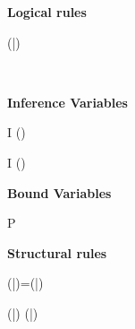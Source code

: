 \begin{figure*}[htbp]
\centering
{}
\vspace*{1em}

\begin{minipage}[t]{.4\textwidth}
\centering  
\textbf{Logical rules}
\vspace*{-1em}

\infax
  { \jexc{\Bottom}{\alpha}{\TRUE} }

\infrule
  { \jsub{\alpha}{\Bottom}{\C} }
  { \jexc{\Any}{\alpha}{\C} }

\infrule
  { \countof(\bar{\alpha})  }
  {  }

\infax
  {  }

\infrule
  { \jexc{\alpha}{\chi}{\C} \andalso 
    \\
    }
  {  }

\infrule
  { \jexc{\alpha}{\chi}{\C}  \andalso  {} }
  {  }

\vspace*{2ex}
\textbf{Inference Variables}
\vspace*{-1em}

\infrule
  { I \not\in {}(\Delta) }
  {  }
  
\infrule
  { I \not\in {}(\Delta) }
  {  }

\vspace*{2ex}
\textbf{Bound Variables}
\vspace*{-1em}

\infrule
  { \bd{\dontcare} \extends P \extends \bdb{\xi} \in \Delta \\
    \jbexc{\xi}{\alpha}{\C} }
  {  }

\vspace*{2ex}
\textbf{Structural rules}
\vspace*{-1em}

\infrule
  { \countof(\bar{\alpha})=\countof(\bar{\eta})  \andalso {} }
  { \jexc{(\bar{\alpha})}{(\bar{\eta})}{\bigvee\set{\C}} }

\infrule
  { \countof(\bar{\alpha}) \neq \countof(\bar{\eta}) }
  { \jexc{(\bar{\alpha})}{(\bar{\eta})}{\TRUE} }


\end{minipage}
\end{figure*}
